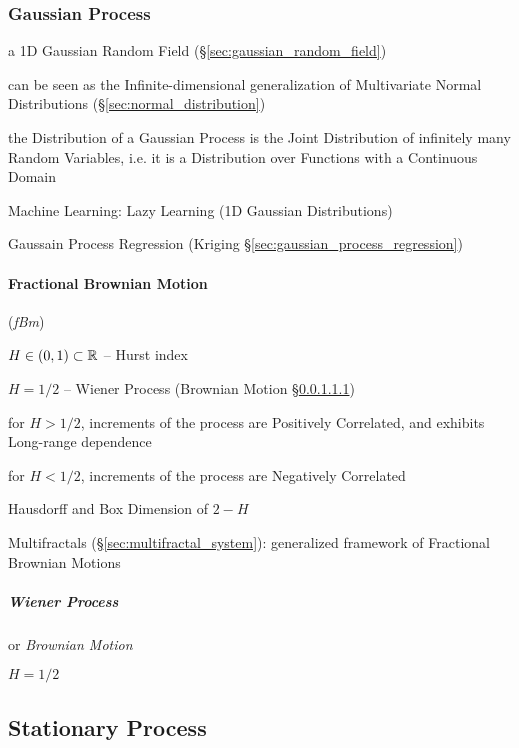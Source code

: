 \subsubsection{Gaussian Process}\label{sec:gaussian_process}

a 1D Gaussian Random Field (\S\ref{sec:gaussian_random_field})

can be seen as the Infinite-dimensional generalization of Multivariate Normal
Distributions (\S\ref{sec:normal_distribution})

the Distribution of a Gaussian Process is the Joint Distribution of infinitely
many Random Variables, i.e. it is a Distribution over Functions with a
Continuous Domain

Machine Learning: Lazy Learning (1D Gaussian Distributions)

Gaussain Process Regression (Kriging \S\ref{sec:gaussian_process_regression})



\paragraph{Fractional Brownian Motion}\label{sec:fractional_brownian}\hfill

(\emph{fBm})

$H \in (0,1) \subset \mathbb{R}$ -- Hurst index

$H = 1/2$ -- Wiener Process (Brownian Motion \S\ref{sec:wiener_process})

for $H > 1/2$, increments of the process are Positively Correlated, and exhibits
Long-range dependence

for $H < 1/2$, increments of the process are Negatively Correlated

Hausdorff and Box Dimension of $2 - H$

\fist Multifractals (\S\ref{sec:multifractal_system}): generalized framework of
Fractional Brownian Motions



\subparagraph{Wiener Process}\label{sec:wiener_process}\hfill

or \emph{Brownian Motion}

$H = 1/2$



\subsection{Stationary Process}\label{sec:stationary_process}

